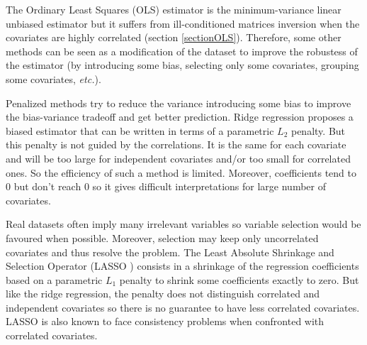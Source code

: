 \documentclass[11pt,a4paper]{article}
\begin{document}
	The Ordinary Least Squares (\textsc{OLS}) estimator is the minimum-variance linear unbiased estimator but it suffers from ill-conditioned matrices inversion when the covariates are highly correlated (section \ref{sectionOLS}). Therefore, some other methods can be seen as a modification of the dataset to improve the robustess of the estimator (by introducing some bias, selecting only some covariates, grouping some covariates, {\it etc.}).



	 Penalized methods try to reduce the variance introducing some bias to improve the bias-variance tradeoff and get better prediction.
	Ridge regression \cite{marquardt1975ridge} proposes a biased estimator that can be written in terms of a parametric $L_2$ penalty.
	But this penalty is not guided by the correlations. It is the same for each covariate and will be too large for independent covariates and/or too small for correlated ones. So the efficiency of such a method is limited. 
	Moreover, coefficients tend to 0 but don't reach 0 so it gives difficult interpretations for large number of covariates. 
	
	Real datasets often imply many irrelevant variables so variable selection would be favoured when possible. Moreover, selection may keep only uncorrelated covariates and thus resolve the problem.	
	The Least Absolute Shrinkage and Selection Operator (\textsc{LASSO} \cite{tibshirani1996regression}) consists in a shrinkage of the regression coefficients based on a parametric $L_1$ penalty to shrink some coefficients exactly to zero.
But like the ridge regression, the penalty does not distinguish correlated and independent covariates so there is no guarantee to have less correlated covariates.
	 \textsc{LASSO} is also known to face consistency problems \cite{Zhao2006MSC} when confronted with correlated covariates.
	 \\
	 
\end{document}
